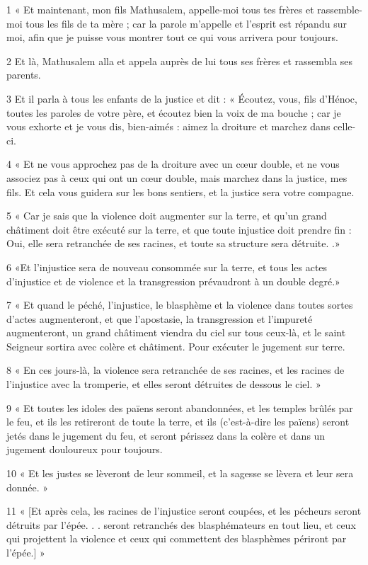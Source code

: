 
\par 1 « Et maintenant, mon fils Mathusalem, appelle-moi tous tes frères et rassemble-moi tous les fils de ta mère ; car la parole m'appelle et l'esprit est répandu sur moi, afin que je puisse vous montrer tout ce qui vous arrivera pour toujours.
\par 2 Et là, Mathusalem alla et appela auprès de lui tous ses frères et rassembla ses parents.
\par 3 Et il parla à tous les enfants de la justice et dit : « Écoutez, vous, fils d'Hénoc, toutes les paroles de votre père, et écoutez bien la voix de ma bouche ; car je vous exhorte et je vous dis, bien-aimés : aimez la droiture et marchez dans celle-ci.
\par 4 « Et ne vous approchez pas de la droiture avec un cœur double, et ne vous associez pas à ceux qui ont un cœur double, mais marchez dans la justice, mes fils. Et cela vous guidera sur les bons sentiers, et la justice sera votre compagne.
\par 5 « Car je sais que la violence doit augmenter sur la terre, et qu'un grand châtiment doit être exécuté sur la terre, et que toute injustice doit prendre fin : Oui, elle sera retranchée de ses racines, et toute sa structure sera détruite. .»
\par 6 «Et l'injustice sera de nouveau consommée sur la terre, et tous les actes d'injustice et de violence et la transgression prévaudront à un double degré.»
\par 7 « Et quand le péché, l'injustice, le blasphème et la violence dans toutes sortes d'actes augmenteront, et que l'apostasie, la transgression et l'impureté augmenteront, un grand châtiment viendra du ciel sur tous ceux-là, et le saint Seigneur sortira avec colère et châtiment. Pour exécuter le jugement sur terre.
\par 8 « En ces jours-là, la violence sera retranchée de ses racines, et les racines de l'injustice avec la tromperie, et elles seront détruites de dessous le ciel. »
\par 9 « Et toutes les idoles des païens seront abandonnées, et les temples brûlés par le feu, et ils les retireront de toute la terre, et ils (c'est-à-dire les païens) seront jetés dans le jugement du feu, et seront périssez dans la colère et dans un jugement douloureux pour toujours.
\par 10 « Et les justes se lèveront de leur sommeil, et la sagesse se lèvera et leur sera donnée. »
\par 11 « [Et après cela, les racines de l'injustice seront coupées, et les pécheurs seront détruits par l'épée. . . seront retranchés des blasphémateurs en tout lieu, et ceux qui projettent la violence et ceux qui commettent des blasphèmes périront par l'épée.] »
